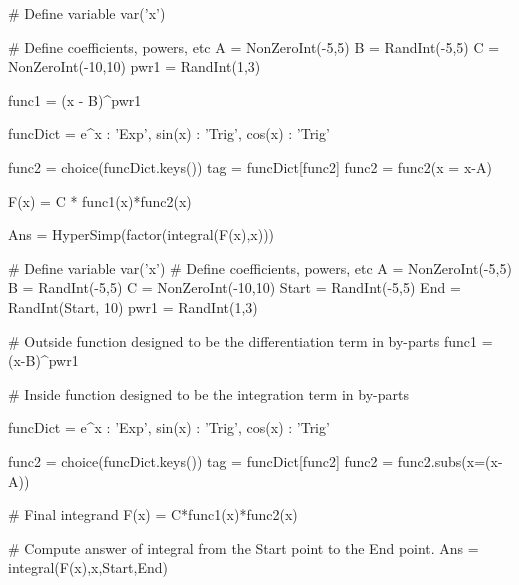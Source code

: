 \begin{sagesilent}
# Define variable
var('x')

# Define coefficients, powers, etc
A = NonZeroInt(-5,5)
B = RandInt(-5,5)
C = NonZeroInt(-10,10)
pwr1 = RandInt(1,3)

func1 = (x - B)^pwr1

funcDict = {
  e^x    : 'Exp',
  sin(x) : 'Trig',
  cos(x) : 'Trig'
}

func2 = choice(funcDict.keys())
tag   = funcDict[func2]
func2 = func2(x = x-A)

F(x) = C * func1(x)*func2(x)

Ans = HyperSimp(factor(integral(F(x),x)))

\end{sagesilent}



\begin{sagesilent}
# Define variable
var('x')
# Define coefficients, powers, etc
A = NonZeroInt(-5,5)
B = RandInt(-5,5)
C = NonZeroInt(-10,10)
Start = RandInt(-5,5)
End = RandInt(Start, 10)
pwr1 = RandInt(1,3)

# Outside function designed to be the differentiation term in by-parts
func1 = (x-B)^pwr1

# Inside function designed to be the integration term in by-parts

funcDict = {
  e^x    : 'Exp',
  sin(x) : 'Trig',
  cos(x) : 'Trig'
}

func2 = choice(funcDict.keys())
tag = funcDict[func2]
func2 = func2.subs(x=(x-A))

# Final integrand
F(x) = C*func1(x)*func2(x)

# Compute answer of integral from the Start point to the End point.
Ans = integral(F(x),x,Start,End)
\end{sagesilent}


